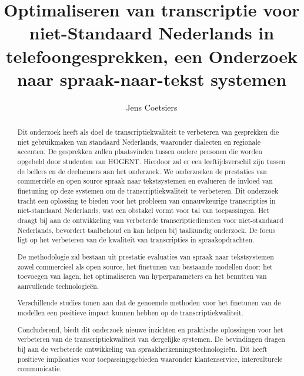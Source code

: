 \documentclass{hogent-article}
\title{Optimaliseren van transcriptie voor niet-Standaard Nederlands in telefoongesprekken, een Onderzoek naar spraak-naar-tekst systemen}
\author{Jens Coetsiers}
\begin{document}
\begin{abstract}
Dit onderzoek heeft als doel de transcriptiekwaliteit te verbeteren van gesprekken die niet gebruikmaken van standaard Nederlands, waaronder dialecten en regionale accenten. De gesprekken zullen plaatsvinden tussen oudere personen die worden opgebeld door studenten van HOGENT. Hierdoor zal er een leeftijdsverschil zijn tussen de bellers en de deelnemers aan het onderzoek.
We onderzoeken de prestaties van commerciële en open source spraak naar tekstsystemen en evalueren de invloed van finetuning op deze systemen om de transcriptiekwaliteit te verbeteren. Dit onderzoek tracht een oplossing te bieden voor het probleem van onnauwkeurige transcripties in niet-standaard Nederlands, wat een obstakel vormt voor tal van toepassingen. Het draagt bij aan de ontwikkeling van verbeterde transcriptiediensten voor niet-standaard Nederlands, bevordert taalbehoud en kan helpen bij taalkundig onderzoek. De focus ligt op het verbeteren van de kwaliteit van transcripties in spraakopdrachten.

De methodologie zal bestaan uit prestatie evaluaties van spraak naar tekstsystemen zowel commercieel als open source, het finetunen van bestaande modellen door: het toevoegen van lagen, het optimaliseren van hyperparameters en het benutten van aanvullende technologieën.

Verschillende studies tonen aan dat de genoemde methoden voor het finetunen van de modellen een positieve impact kunnen hebben op de transcriptiekwaliteit.

Concluderend, biedt dit onderzoek nieuwe inzichten en praktische oplossingen voor het verbeteren van de transcriptiekwaliteit van dergelijke systemen. De bevindingen dragen bij aan de verbeterde ontwikkeling van spraakherkenningstechnologieën. Dit heeft positieve implicaties voor toepassingsgebieden waaronder klantenservice, interculturele communicatie.
\end{abstract}

\tableofcontents



\printbibliography[heading=bibintoc]
\end{document}
